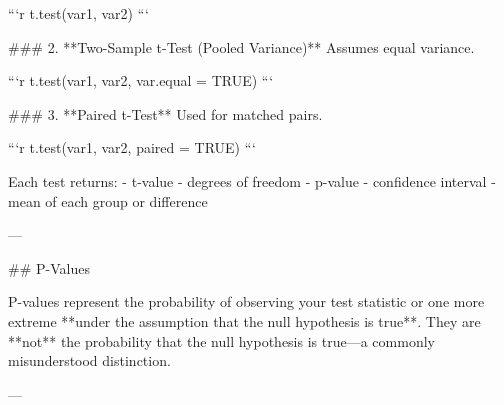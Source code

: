 ```r
t.test(var1, var2)
```

### 2. **Two-Sample t-Test (Pooled Variance)**  
Assumes equal variance.

```r
t.test(var1, var2, var.equal = TRUE)
```

### 3. **Paired t-Test**  
Used for matched pairs.

```r
t.test(var1, var2, paired = TRUE)
```

Each test returns:
- t-value
- degrees of freedom
- p-value
- confidence interval
- mean of each group or difference

---

## P-Values

P-values represent the probability of observing your test statistic or one more extreme **under the assumption that the null hypothesis is true**. They are **not** the probability that the null hypothesis is true—a commonly misunderstood distinction.

---

